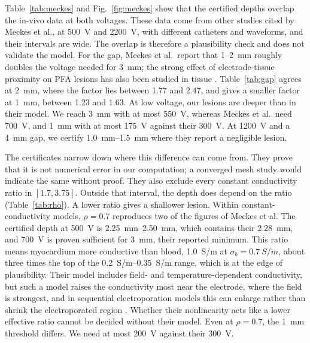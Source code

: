 \documentclass[11pt]{article}
\begin{document}
Table~\ref{tab:meckes} and Fig.~\ref{fig:meckes} show that the certified
depths overlap the in-vivo data at both voltages. These data come from other
studies cited by Meckes et al., at \SI{500}{V} and \SI{2200}{V}, with
different catheters and waveforms, and their
intervals are wide. The overlap is therefore a plausibility check and does not
validate the model. For the gap, Meckes et al.\
report that 1--\SI{2}{mm} roughly doubles the voltage needed for \SI{3}{mm};
the strong effect of electrode-tissue proximity on PFA lesions has also been
studied in tissue \cite{howard2022}.
Table~\ref{tab:gap} agrees at \SI{2}{mm}, where the factor lies between
1.77 and 2.47, and gives a smaller factor at \SI{1}{mm}, between 1.23 and 1.63. At low
voltage, our lesions are deeper than in their model. We reach \SI{3}{mm} with at
most \SI{550}{V}, whereas Meckes et al.\ need \SI{700}{V}, and \SI{1}{mm} with
at most \SI{175}{V} against their \SI{300}{V}. At \SI{1200}{V} and a \SI{4}{mm}
gap, we certify \SIrange{1.0}{1.5}{mm} where they report a negligible lesion.

The certificates narrow down where this difference can come from. They prove
that it is not numerical error in our computation; a converged mesh study would
indicate the same without proof. They also exclude every constant conductivity
ratio in $[1.7,3.75]$. Outside that interval, the depth does depend on the ratio
(Table~\ref{tab:rho}). A lower ratio gives a shallower lesion. Within
constant-conductivity models,
$\rho=0.7$ reproduces two of the figures of Meckes et al. The certified depth at
\SI{500}{V} is \SIrange{2.25}{2.50}{mm}, which contains their \SI{2.28}{mm},
and \SI{700}{V} is proven sufficient for \SI{3}{mm}, their reported minimum.
This ratio means myocardium more conductive than blood, \SI{1.0}{S/m} at
$\sigma_b=\SI{0.7}{S/m}$, about three times the top of the
\SIrange{0.2}{0.35}{S/m} range, which is at the edge of plausibility. Their model
includes field- and temperature-dependent conductivity, but such a model raises
the conductivity most near the electrode, where the field is strongest, and in
sequential electroporation models this can enlarge rather than shrink the
electroporated region \cite{sel2005}. Whether their nonlinearity acts like a lower effective ratio
cannot be decided without their model. Even at $\rho=0.7$, the \SI{1}{mm}
threshold differs. We need at most \SI{200}{V} against their \SI{300}{V}.
\end{document}
